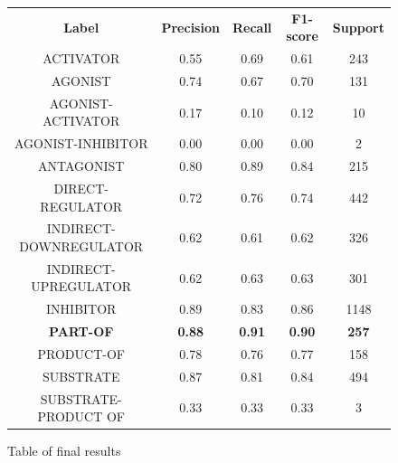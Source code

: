 \documentclass{l4proj}
\begin{document}
\begin{figure}[h]
\centering
\begin{tabular}{||c c c c c||}
\textbf{Label} & \textbf{Precision} & \textbf{Recall} & \textbf{F1-score} & \textbf{Support} \\
ACTIVATOR & 0.55 & 0.69 & 0.61 & 243\\
AGONIST & 0.74 & 0.67 & 0.70 & 131\\
AGONIST-ACTIVATOR & 0.17 & 0.10 & 0.12 & 10\\
AGONIST-INHIBITOR & 0.00 & 0.00 & 0.00 & 2\\
ANTAGONIST & 0.80 & 0.89 & 0.84 & 215\\
DIRECT-REGULATOR & 0.72 & 0.76 & 0.74 & 442\\
INDIRECT-DOWNREGULATOR & 0.62 & 0.61 & 0.62 & 326\\
INDIRECT-UPREGULATOR & 0.62 & 0.63 & 0.63 & 301\\
INHIBITOR & 0.89 & 0.83 & 0.86 & 1148\\
\textbf{PART-OF} & \textbf{0.88} & \textbf{0.91} & \textbf{0.90} & \textbf{257}\\
PRODUCT-OF & 0.78 & 0.76 & 0.77 & 158\\
SUBSTRATE & 0.87 & 0.81 & 0.84 & 494\\
SUBSTRATE-PRODUCT OF & 0.33 & 0.33 & 0.33 & 3 \\
\end{tabular}
\caption{Table of final results}
\label{fig:results}
\end{figure}

\end{document}

